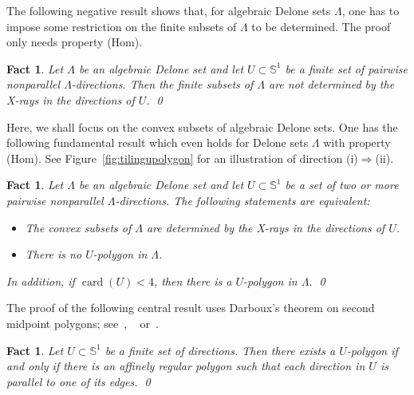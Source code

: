 \documentclass[a4paper]{amsart}
\newtheorem{fact}[theorem]{Fact}
\theoremstyle{definition}
\numberwithin{equation}{section}
\numberwithin{theorem}{section}
\begin{document}
The following negative result shows that, for algebraic Delone sets $\varLambda$, one has to impose some restriction on the finite subsets of
$\varLambda$ to
be determined. The proof only needs property (Hom).

\begin{fact}\cite[Prop.~ 3.1 and Remark 3.2]{H5}\label{source}
Let $\varLambda$ be an algebraic Delone set and let
$U\subset\mathbb{S}^{1}$ be a finite set of pairwise nonparallel
$\varLambda$-directions. Then the finite subsets of $\varLambda$ are
not determined by the X-rays in the directions of $U$. \qed
\end{fact}

Here, we shall focus on the convex subsets of algebraic Delone
sets. One has the following fundamental 
result which even holds for Delone sets $\varLambda$ with property
(Hom). See Figure~\ref{fig:tilingupolygon} for an
illustration of direction
(i)$\Rightarrow$(ii).

\begin{fact}\cite[Prop.~ 4.6 and Lemma 4.5]{H5}\label{characungen}
Let $\varLambda$ be an algebraic Delone set and let $U\subset\mathbb{S}^{1}$ be a set of two or more pairwise nonparallel $\varLambda$-directions. The following statements are equivalent:
\begin{itemize}
\item[(i)]
The convex subsets of $\varLambda$ are determined by the X-rays in the directions of $U$.
\item[(ii)]
There is no $U$-polygon in $\varLambda$.
\end{itemize}
In addition, if $\operatorname{card}(U)<4$, then there is a $U$-polygon in $\varLambda$.  \qed
\end{fact}

The proof of the following central result uses Darboux's theorem on second 
midpoint polygons; see~\cite{D}, ~\cite{GM} or~\cite[Ch.~1]{G}.

\begin{fact}\cite[Prop.~ 4.2]{GG}\label{uaffine}
Let $U\subset\mathbb{S}^1$ be a finite set of directions. Then there
exists a $U$-polygon if and only if there is an affinely regular
polygon such that each direction in $U$ is parallel to one of its edges.  \qed
\end{fact}
\end{document}
